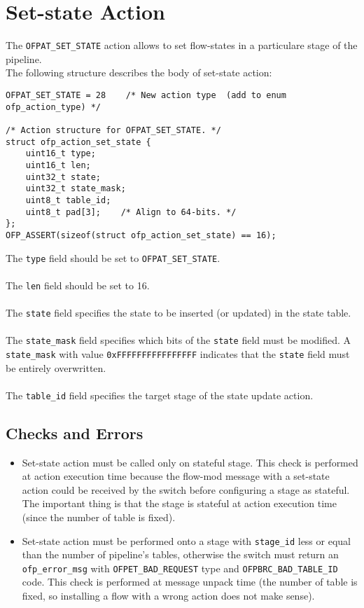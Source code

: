 \section{Set-state Action}
\label{sec:act_set_state_proto}

The \texttt{OFPAT\_SET\_STATE} action allows to set flow-states in a particulare stage of the pipeline.\\The following structure describes the body of set-state action:

\scriptsize
\begin{verbatim}
OFPAT_SET_STATE = 28    /* New action type  (add to enum ofp_action_type) */

/* Action structure for OFPAT_SET_STATE. */
struct ofp_action_set_state {
    uint16_t type;
    uint16_t len;
    uint32_t state;
    uint32_t state_mask;
    uint8_t table_id;
    uint8_t pad[3];    /* Align to 64-bits. */
};
OFP_ASSERT(sizeof(struct ofp_action_set_state) == 16);
\end{verbatim}
\normalsize
\noindent
The \texttt{type} field should be set to \texttt{OFPAT\_SET\_STATE}.
\\\\
The \texttt{len} field should be set to 16.
\\\\
The \texttt{state} field specifies the state to be inserted (or updated) in the state table.
\\\\
The \texttt{state\_mask} field specifies which bits of the \texttt{state} field must be modified. A \texttt{state\_mask} with value \texttt{0xFFFFFFFFFFFFFFFF} indicates that the \texttt{state} field must be entirely overwritten.
\\\\
The \texttt{table\_id} field specifies the target stage of the state update action.

\subsection{Checks and Errors}

\begin{itemize}
\item Set-state action must be called only on stateful stage. This check is performed at action execution time because the flow-mod message with a set-state action could be received by the switch before configuring a stage as stateful. The important thing is that the stage is stateful at action execution time (since the number of table is fixed).

\item Set-state action must be performed onto a stage with \texttt{stage\_id} less or equal than the number of pipeline’s tables, otherwise the switch must return an \texttt{ofp\_error\_msg} with \texttt{OFPET\_BAD\_REQUEST} type and \texttt{OFPBRC\_BAD\_TABLE\_ID} code. This check is performed at message unpack time (the number of table is fixed, so installing a flow with a wrong action does not make sense).
\end{itemize}

